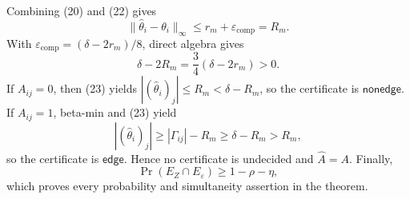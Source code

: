 Combining (20) and (22) gives
\[
 \lVert\widehat\theta_i-\theta_i\rVert_\infty\le r_m+\varepsilon_{\mathrm{comp}}=R_m.         \tag{23}
\]
With \(\varepsilon_{\mathrm{comp}}=(\delta-2r_m)/8\), direct algebra gives
\[
 \delta-2R_m=\frac34(\delta-2r_m)>0.                                  \tag{24}
\]
If \(A_{ij}=0\), then (23) yields \(|(\widehat\theta_i)_j|\le R_m<\delta-R_m\), so the certificate is \(\mathsf{nonedge}\).  If \(A_{ij}=1\), beta-min and (23) yield
\[
 |(\widehat\theta_i)_j|\ge|\Gamma_{ij}|-R_m\ge\delta-R_m>R_m,
\]
so the certificate is \(\mathsf{edge}\).  Hence no certificate is undecided and \(\widehat A=A\).  Finally,
\[
 \Pr(E_Z\cap E_\varepsilon)\ge1-\rho-\eta,
\]
which proves every probability and simultaneity assertion in the theorem.